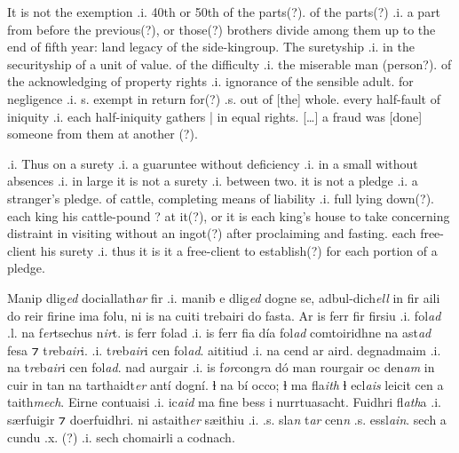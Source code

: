 \documentclass[11pt]{article}
\begin{document}
\begin{pages}
\begin{Rightside}
    \pstart
    It is not the exemption .i. 40th or 50th of the parts(?). of the parts(?) .i. a part from before the previous(?), or those(?) brothers divide among them up to the end of fifth year: land legacy of the side-kingroup. The suretyship .i. in the securityship of a unit of value.  of the difficulty .i. the miserable man (person?). of the acknowledging of property rights .i. ignorance of the sensible adult. for negligence .i. s. exempt in return for(?) .s. out of [the] whole. every half-fault of iniquity .i. each half-iniquity gathers | in equal rights. [\ldots{}]  a fraud was [done] someone from them at another (?). 
    \pend
  
    \pstart
    [\ldots{}?] .i. Thus on a surety .i. a guaruntee without deficiency .i. in a small without absences .i. in large it is not a surety .i. between two.  it is not a pledge .i. a stranger's pledge.  of cattle, completing means of liability .i. full lying down(?).  each king his cattle-pound ? at it(?), or it is each king's house to take concerning distraint in visiting without an ingot(?) after proclaiming and fasting.  each free-client his surety .i. thus it is it a free-client to establish(?) for each portion of a pledge.

    \pend
  \endnumbering
  \end{Rightside}
  \Pages
 
  \begin{Leftside}
    \beginnumbering
   \pstart 
    Manip dlig\emph{ed} dociallath\emph{ar}  fir .i. manib e dlig\emph{ed} dogne se, adbul-dich\emph{ell} in fir aili do reir firine ima folu, ni is  na cuiti trebairi do fasta.  Ar is ferr fir firsiu .i. fol\emph{ad} .l. na f\emph{er}tsechus n\emph{ir}t.  is ferr folad .i. is ferr fia d\'{i}a fol\emph{ad} comtoiridhne na ast\emph{ad} fesa ⁊ t\emph{r}eb\emph{air}i.   .i. t\emph{r}eb\emph{air}i cen fol\emph{ad}.  aititiud .i. na cend ar aird.  degnadmaim .i. na t\emph{re}b\emph{air}i cen fol\emph{ad}.   nad aurgair .i. is f\emph{or}cong\emph{r}a d\'{o} man rourgair oc den\emph{am} in cuir in tan na tarthaidt\emph{er} ant\'{i} dogn\'{i}.  ɫ na b\'{i} occo; ɫ ma fla\emph{ith} ɫ ecl\emph{ais} leicit cen a taith\emph{mech}.  Eirne contuaisi .i. ic\emph{aid} ma fine bess i nurrtuasacht.  Fuidhri fl\emph{ath}a .i. særfuigir ⁊ doerfuidhri.  ni astaith\emph{er} sæithiu .i. .s. sla\emph{n} t\emph{ar} cen\emph{n} .s. essl\emph{ain}.  sech a cundu .x. (?) .i. sech chomairli a codnach. 
    \pend
  

\end{Leftside}
\end{pages}
\end{document}
